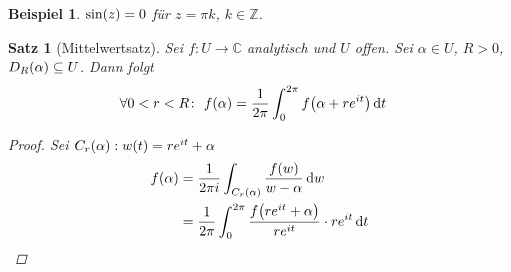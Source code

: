 \documentclass[11pt, a4paper]{article}
\theoremstyle{plain}
\newtheorem{satz}[blockelement]{Satz}
\newtheorem{beispiel}[blockelement]{Beispiel}
\numberwithin{equation}{subsection}
\newcommand{\of}[1]{\mathopen{}\mathclose{}\bgroup\left(#1\aftergroup\egroup\right)}
\newcommand{\dif}{\mathop{}\!\mathrm{d}}
\newcommand{\C}{\mathbb{C}}
\newcommand{\Z}{\mathbb{Z}}
\begin{document}
    \begin{beispiel}
        $\sin\of{z} = 0$ für $z = \pi k$, $k\in\Z$.
    \end{beispiel}

    \begin{satz}[Mittelwertsatz] %
        \label{satz:mittelwertsatz}
        Sei $f: U\to\C$ analytisch und $U$ offen. Sei $\alpha\in U$, $R > 0$, $D_R\of{\alpha}\subseteq U$. Dann folgt
        \begin{align*}
            \forall 0 < r < R\colon~f\of{\alpha} &= \frac{1}{2\pi} \int_{0}^{2\pi} f\of{\alpha + r e^{it}} \dif t
        \end{align*}

        \begin{proof}
            Sei $C_r\of{\alpha}: w\of{t} = re^{it} + \alpha$
            \begin{align*}
                f\of{\alpha} &= \frac{1}{2\pi i} \int_{C_r\of{\alpha}}^{} \frac{f\of{w}}{w-\alpha} \dif w\\
                &= \frac{1}{2\pi} \int_{0}^{2\pi} \frac{f\of{re^{it} + \alpha}}{re^{it}}\cdot re^{it} \dif t\qedhere
            \end{align*}
        \end{proof}
    \end{satz}
\end{document}
